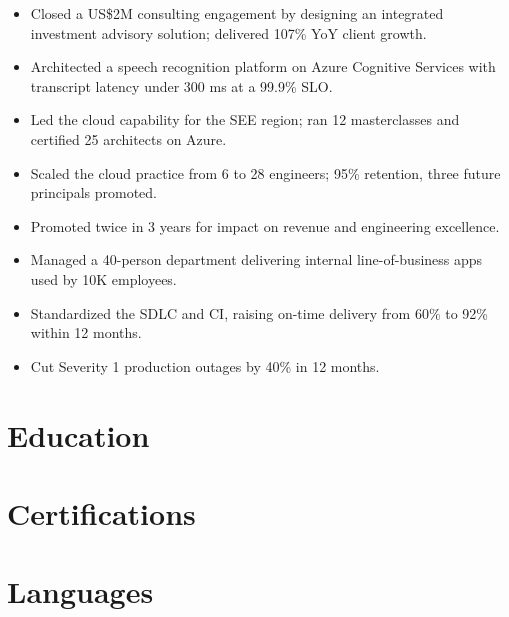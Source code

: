 \documentclass{milanovic-resume}
\begin{document}
\begin{itemize}
  \item Closed a US\$2M consulting engagement by designing an integrated investment advisory solution;
        delivered 107\% YoY client growth.
  \item Architected a speech recognition platform on Azure Cognitive Services with transcript latency
        under 300 ms at a 99.9\% SLO.
  \item Led the cloud capability for the SEE region; ran 12 masterclasses and certified 25 architects on Azure.
  \item Scaled the cloud practice from 6 to 28 engineers; 95\% retention, three future principals promoted.
  \item Promoted twice in 3 years for impact on revenue and engineering excellence.
\end{itemize}

\begin{itemize}
  \item Managed a 40-person department delivering internal line-of-business apps used by 10K employees.
  \item Standardized the SDLC and CI, raising on-time delivery from 60\% to 92\% within 12 months.
  \item Cut Severity 1 production outages by 40\% in 12 months.
\end{itemize}

\section{Education}
\begin{itemize}
\end{itemize}

\section{Certifications}

\section{Languages}
\end{document}
